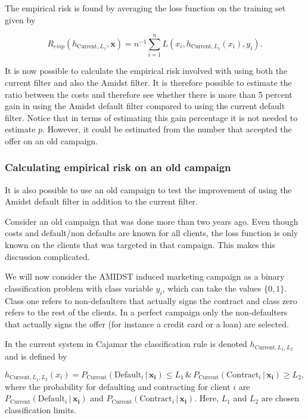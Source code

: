 \documentclass{article}
\theoremstyle{theorem}
\theoremstyle{definition}
\newcommand{\bv}[1]{\bm{#1}}
\begin{document}
The empirical risk is found by averaging the loss function on the training set given by 

\begin{equation}
\label{def:empRisk}
R_{emp}(h_{\mbox{Current},L_1}, \bv{x}) = n^{-1} \sum_{i=1}^n L(x_i, h_{\mbox{Current},L_1}(x_i), y_i).
\end{equation}

It is now possible to calculate the empirical risk involved with using both the current filter and also the Amidst filter.  It is therefore possible to estimate the ratio between the costs and therefore see whether there is more than 5 percent gain in using the Amidst default filter compared to using the current default filter.  Notice that in terms of estimating this gain percentage it is not needed to estimate $p$.  However, it could be estimated from the number that accepted the offer on an old campaign.


\subsubsection*{Calculating empirical risk on an old campaign}

It is also possible to use an old campaign to test the improvement of using the Amidst default filter in addition to the current filter. 

Consider an old campaign that was done more than two years ago. Even though costs and default/non defaults are known for all clients, the loss function is only known on the clients that was targeted in that campaign.  This makes this discussion complicated. 

We will now consider the AMIDST induced marketing campaign as a binary classification problem with class variable $y_i$, which can take the values $\{0,1\}$. Class one refers to non-defaulters that actually signs the contract and class zero refers to the rest of the clients.  In a perfect campaign only the non-defaulters that actually signs the offer (for instance a credit card or a loan) are selected.  

In the current system in Cajamar the classification rule is denoted $h_{\mbox{Current},L_1,L_2}$ and is defined by

\begin{equation}
\label{def:empRisk}
h_{\mbox{Current},L_1,L_2}(x_i) = P_{\mbox{Current}}(\mbox{Default}_i \,|\, \bv{x_i}) \leq L_1 \, \& \,P_{\mbox{Current}}(\mbox{Contract}_i \,|\, \bv{x_i}) \geq L_2,
\end{equation}
where the probability for defaulting and contracting for client $i$ are $P_{\mbox{Current}}(\mbox{Default}_i \,|\, \bv{x_i})$ and $P_{\mbox{Current}}(\mbox{Contract}_i \,|\, \bv{x_i})$.  Here, $L_1$ and $L_2$ are chosen classification limits. 
\end{document}

